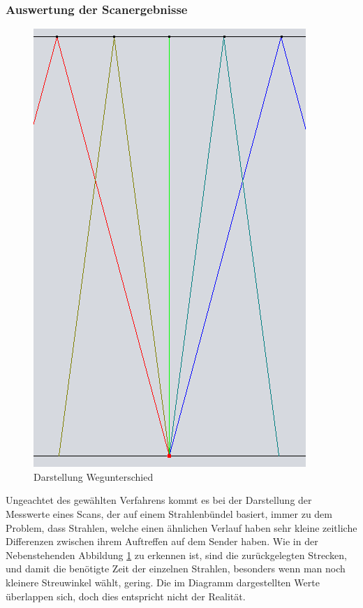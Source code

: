 \documentclass[reducespace,stylepage,semiarbeit]{spezidoc}
\begin{document}
\newpage
\subsubsection{Auswertung der Scanergebnisse} %
\begin{figure}
\includegraphics[scale=0.25]{pictures/Strahlenbuendel.png} 
\caption{Darstellung Wegunterschied}
\label{fig:Wegunters}
\end{figure} 
Ungeachtet des gewählten Verfahrens kommt es bei der Darstellung der Messwerte eines Scans, der auf einem Strahlenbündel basiert, immer zu dem Problem, dass Strahlen, welche einen ähnlichen Verlauf haben sehr kleine zeitliche Differenzen zwischen ihrem Auftreffen auf dem Sender haben. 
Wie in der Nebenstehenden Abbildung \ref{fig:Wegunters} zu erkennen ist, sind die zurückgelegten Strecken, und damit die benötigte Zeit der einzelnen Strahlen, besonders wenn man noch kleinere Streuwinkel wählt, gering. 
Die im Diagramm dargestellten Werte überlappen sich, doch dies entspricht nicht der Realität. 
\end{document}
